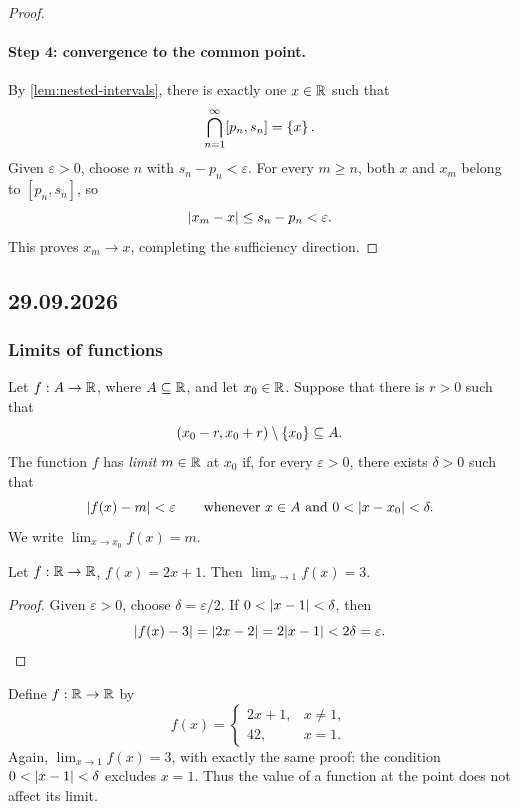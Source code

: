 \documentclass[11pt,a4paper]{amsart}
\begin{document}
\begin{proof}
  \paragraph{Step 4: convergence to the common point.}
  By \cref{lem:nested-intervals}, there is exactly one \(x\in\mathbb{R}\)
  such that
  \[
    \bigcap_{n=1}^{\infty}[p_n,s_n]=\left\lbrace x\right\rbrace.
  \]
  Given \(\varepsilon>0\), choose \(n\) with
  \(s_n-p_n<\varepsilon\). For every \(m\geq n\), both
  \(x\) and \(x_m\) belong to \([p_n,s_n]\), so
  \[
    \lvert x_m-x\rvert\leq s_n-p_n<\varepsilon.
  \]
  This proves \(x_m\to x\), completing the sufficiency direction.
\end{proof}

\subsection{29.09.2026}

\subsubsection{Limits of functions}

\begin{definition}
  Let \(f:A\to\mathbb{R}\), where \(A\subseteq\mathbb{R}\), and let
  \(x_0\in\mathbb{R}\). Suppose that there is \(r>0\) such that
  \[
    (x_0-r,x_0+r)\setminus\left\lbrace x_0\right\rbrace\subseteq A.
  \]
  The function \(f\) has \emph{limit} \(m\in\mathbb{R}\) at \(x_0\) if,
  for every \(\varepsilon>0\), there exists \(\delta>0\) such that
  \[
    \lvert f(x)-m\rvert<\varepsilon
    \qquad\text{whenever }x\in A\text{ and }0<\lvert x-x_0\rvert<\delta.
  \]
  We write \(\lim_{x\to x_0}f(x)=m\).
\end{definition}

\begin{example}
  Let \(f:\mathbb{R}\to\mathbb{R}\), \(f(x)=2x+1\). Then
  \(\lim_{x\to1}f(x)=3\).
\end{example}

\begin{proof}
  Given \(\varepsilon>0\), choose \(\delta=\varepsilon/2\).
  If \(0<\lvert x-1\rvert<\delta\), then
  \[
    \lvert f(x)-3\rvert=\lvert2x-2\rvert=2\lvert x-1\rvert<2\delta=\varepsilon.
  \]
\end{proof}

\begin{example}
  Define \(f:\mathbb{R}\to\mathbb{R}\) by
  \[
    f(x)=
    \begin{cases}
      2x+1, & x\neq1,\\
      42, & x=1.
    \end{cases}
  \]
  Again, \(\lim_{x\to1}f(x)=3\), with exactly the same proof:
  the condition \(0<\lvert x-1\rvert<\delta\) excludes \(x=1\).
  Thus the value of a function at the point does not affect its limit.
\end{example}
\end{document}
